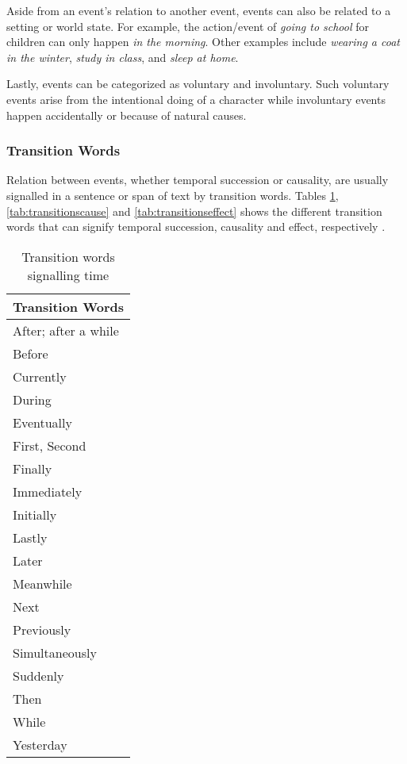 Aside from an event's relation to another event, events can also be related to a setting or world state. For example, the action/event of \textit{going to school} for children can only happen \textit{in the morning}. Other examples include \textit{wearing a coat in the winter}, \textit{study in class}, and \textit{sleep at home}.

Lastly, events can be categorized as voluntary and involuntary. Such voluntary events arise from the intentional doing of a character while involuntary events happen accidentally or because of natural causes.

\subsubsection{Transition Words}
\label{sec:transitionwords}

Relation between events, whether temporal succession or causality, are usually signalled in a sentence or span of text by transition words. Tables \ref{tab:transitionstime}, \ref{tab:transitionscause} and \ref{tab:transitionseffect} shows the different transition words that can signify temporal succession, causality and effect, respectively \cite{Ang:2010}.

\begin{table}[ht]   %
\centering
\caption{Transition words signalling time} \vspace{0.25em}
\begin{tabular}{|l|} \hline
Transition Words \\ \hline
After; after a while \\
Before \\
Currently \\
During \\
Eventually \\
First, Second \\
Finally \\
Immediately \\
Initially \\
Lastly \\
Later \\
Meanwhile \\
Next \\
Previously \\
Simultaneously \\
Suddenly \\
Then \\
While \\
Yesterday \\ \hline
\end{tabular}
\label{tab:transitionstime}
\end{table}

